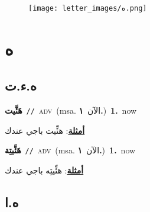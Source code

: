 \documentclass[10pt,a4paper,twoside]{article} %
\begin{document}
\begin{figure*}[t!]\centering\texttt{[image: letter\_images/ه.png]}\end{figure*}
\color{white}

 \section*{\foreignlanguage{arabic}{ه}} 
 \begin{multicols}{2} 

%
\color{black}
\vspace{-3mm}
\subsection*{\color{blue}\foreignlanguage{arabic}{ه.ء.ت}\color{blue}{ (ntws)}} 

{\setlength\topsep{0pt}\textbf{\foreignlanguage{arabic}{هَئَّيت}}\ {\color{gray}\texttt{//}\color{black}}\ \textsc{adv}\ \color{gray}(msa. \foreignlanguage{arabic}{الآن}~\foreignlanguage{arabic}{\textbf{١.}})\color{black}\ \textbf{1.}~now\  \begin{flushright}\color{gray}\foreignlanguage{arabic}{\textbf{\underline{\foreignlanguage{arabic}{أمثلة}}}: هئِّيت باجي عندك}\end{flushright}\color{black}} \vspace{2mm}

{\setlength\topsep{0pt}\textbf{\foreignlanguage{arabic}{هَئَّيتِة}}\ {\color{gray}\texttt{//}\color{black}}\ \textsc{adv}\ \color{gray}(msa. \foreignlanguage{arabic}{الآن}~\foreignlanguage{arabic}{\textbf{١.}})\color{black}\ \textbf{1.}~now\  \begin{flushright}\color{gray}\foreignlanguage{arabic}{\textbf{\underline{\foreignlanguage{arabic}{أمثلة}}}: هئِّيتِه باجي عندك}\end{flushright}\color{black}} \vspace{2mm}

\vspace{-3mm}
\subsection*{\color{blue}\foreignlanguage{arabic}{ه.ا}\color{blue}{ (ntws)}} 


\end{multicols}
\end{document}
